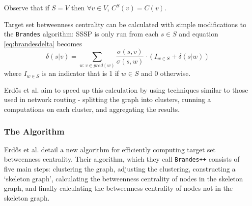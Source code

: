 \documentclass[a4paper,12pt]{article}
\begin{document}
Observe that if $S = V$ then $\forall v \in V$, $C^S(v) = C(v)$. 

Target set betweenness centrality can be calculated with simple modifications to the \texttt{Brandes} algorithm: SSSP is only run from each $s \in S$ and equation \ref{eq:brandesdelta} becomes 
\begin{equation} \label{eq:subsetdelta}
\delta(s|v) = \sum_{w: v \in pred(w)} \frac{\sigma(s,v)}{\sigma(s,w)} \cdot (I_{w\in S}+\delta(s|w))
\end{equation}
where $I_{w \in S}$ is an indicator that is 1 if $w \in S$ and 0 otherwise.

Erd\H{o}s et al. aim to speed up this calculation by using techniques similar to those used in network routing - splitting the graph into clusters, running a computations on each cluster, and aggregating the results.

\subsubsection{The Algorithm}

Erd\H{o}s et al. detail a new algorithm for efficiently computing target set betweenness centrality. Their algorithm, which they call \texttt{Brandes++} consists of five main steps: clustering the graph, adjusting the clustering, constructing a `skeleton graph', calculating the betweenness centrality of nodes in the skeleton graph, and finally calculating the betweenness centrality of nodes not in the skeleton graph.
\end{document}
